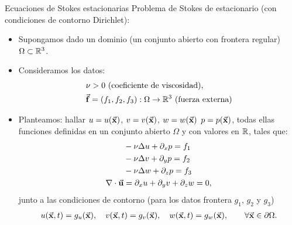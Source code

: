 \documentclass[9pt, dvipsnames,]{beamer}
\begin{document}
\begin{frame}{Ecuaciones de Stokes estacionarias}
  \alert{Problema de Stokes de estacionario} (con condiciones de contorno \alert{Dirichlet}):

  \begin{itemize}


  \item Supongamos dado un dominio (un conjunto abierto con frontera
    regular) $\Omega\subset {\mathbb R}^3$.
  \item Consideramos los datos:
    \begin{align*}
      &\nu>0 \ \text{(coeficiente de viscosidad)},\\
      &\vec{\mathbf{f}}=(f_1,f_2,f_3):\Omega \to {\mathbb R}^3 \ \text{(fuerza externa)}
    \end{align*}

  \item Planteamos: hallar $u=u(\vec{\mathbf{x}})$, $v=v(\vec{\mathbf{x}})$, $w=w(\vec{\mathbf{x}})$
    $p=p(\vec{\mathbf{x}})$, todas ellas funciones definidas en un conjunto
    abierto $\Omega$ y con valores en ${\mathbb R}$, tales que:
    \begin{align*}
      &- \nu\Delta u + \partial_x p = f_1
      \\
      &- \nu\Delta v + \partial_y p = f_2
      \\
      &- \nu\Delta w + \partial_z p = f_3
      \\
      \nabla\cdot{}\vec{\mathbf{u}} &= \partial_x u + \partial_y v + \partial_z w = 0,
    \end{align*}
    junto a las condiciones de contorno (para los datos frontera $g_1$, $g_2$ y $g_3$)
    \begin{align*}
      u(\vec{\mathbf{x}},t)=g_u(\vec{\mathbf{x}}),
      \quad
      v(\vec{\mathbf{x}},t)=g_v(\vec{\mathbf{x}}),
      \quad
      w(\vec{\mathbf{x}},t)=g_w(\vec{\mathbf{x}}),
      \qquad
    \forall \vec{\mathbf{x}}\in\partial\Omega.
    \end{align*}
  \end{itemize}

\end{frame}
\end{document}
